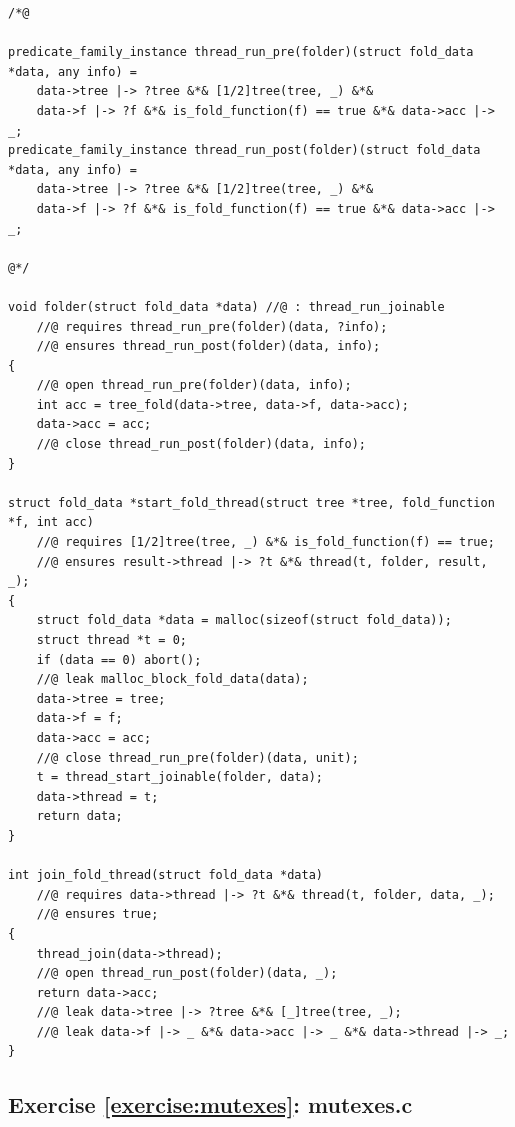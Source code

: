 \documentclass{article}
\begin{document}
\begin{lstlisting}
/*@

predicate_family_instance thread_run_pre(folder)(struct fold_data *data, any info) =
    data->tree |-> ?tree &*& [1/2]tree(tree, _) &*&
    data->f |-> ?f &*& is_fold_function(f) == true &*& data->acc |-> _;
predicate_family_instance thread_run_post(folder)(struct fold_data *data, any info) =
    data->tree |-> ?tree &*& [1/2]tree(tree, _) &*&
    data->f |-> ?f &*& is_fold_function(f) == true &*& data->acc |-> _;

@*/

void folder(struct fold_data *data) //@ : thread_run_joinable
    //@ requires thread_run_pre(folder)(data, ?info);
    //@ ensures thread_run_post(folder)(data, info);
{
    //@ open thread_run_pre(folder)(data, info);
    int acc = tree_fold(data->tree, data->f, data->acc);
    data->acc = acc;
    //@ close thread_run_post(folder)(data, info);
}

struct fold_data *start_fold_thread(struct tree *tree, fold_function *f, int acc)
    //@ requires [1/2]tree(tree, _) &*& is_fold_function(f) == true;
    //@ ensures result->thread |-> ?t &*& thread(t, folder, result, _);
{
    struct fold_data *data = malloc(sizeof(struct fold_data));
    struct thread *t = 0;
    if (data == 0) abort();
    //@ leak malloc_block_fold_data(data);
    data->tree = tree;
    data->f = f;
    data->acc = acc;
    //@ close thread_run_pre(folder)(data, unit);
    t = thread_start_joinable(folder, data);
    data->thread = t;
    return data;
}

int join_fold_thread(struct fold_data *data)
    //@ requires data->thread |-> ?t &*& thread(t, folder, data, _);
    //@ ensures true;
{
    thread_join(data->thread);
    //@ open thread_run_post(folder)(data, _);
    return data->acc;
    //@ leak data->tree |-> ?tree &*& [_]tree(tree, _);
    //@ leak data->f |-> _ &*& data->acc |-> _ &*& data->thread |-> _;
}
\end{lstlisting}

\subsection{Exercise \ref{exercise:mutexes}:
mutexes.c}\label{solution:mutexes}
\end{document}
